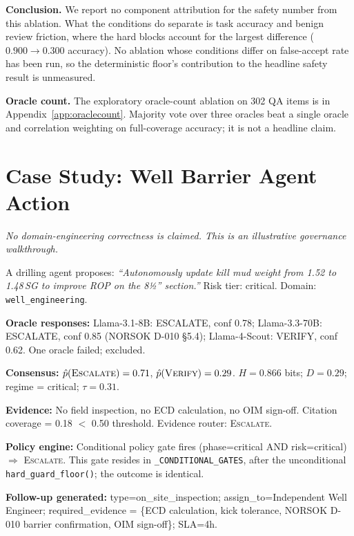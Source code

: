 \documentclass[10pt,twocolumn]{article}
\newcommand{\trust}{\tau}
\begin{document}
\textbf{Conclusion.} We report no component attribution for the safety
number from this ablation. What the conditions do separate is task
accuracy and benign review friction, where the hard blocks account for
the largest difference ($0.900 \to 0.300$ accuracy). No ablation whose
conditions differ on false-accept rate has been run, so the deterministic
floor's contribution to the headline safety result is unmeasured.

\textbf{Oracle count.} The exploratory oracle-count ablation on 302 QA
items is in Appendix~\ref{app:oraclecount}. Majority vote over three
oracles beat a single oracle and correlation weighting on full-coverage
accuracy; it is not a headline claim.

\section{Case Study: Well Barrier Agent Action}
\label{sec:casestudy}

\emph{No domain-engineering correctness is claimed. This is an
illustrative governance walkthrough.}

A drilling agent proposes: \textit{``Autonomously update kill mud
weight from 1.52 to 1.48\,SG to improve ROP on the 8½{\textquotedblright}
section.''} Risk tier: critical. Domain: \texttt{well\_engineering}.

\textbf{Oracle responses:}
Llama-3.1-8B: ESCALATE, conf 0.78;
Llama-3.3-70B: ESCALATE, conf 0.85 (NORSOK D-010 §5.4);
Llama-4-Scout: VERIFY, conf 0.62.
One oracle failed; excluded.

\textbf{Consensus:}
$\hat{p}(\textsc{Escalate}) = 0.71$, $\hat{p}(\textsc{Verify}) = 0.29$.
$H = 0.866$ bits; $D = 0.29$;
regime = critical;
$\trust = 0.31$.

\textbf{Evidence:} No field inspection, no ECD calculation, no OIM
sign-off. Citation coverage = 0.18 $<$ 0.50 threshold.
Evidence router: \textsc{Escalate}.

\textbf{Policy engine:} Conditional policy gate fires
(phase=critical AND risk=critical) $\Rightarrow$ \textsc{Escalate}.
This gate resides in \texttt{\_CONDITIONAL\_GATES}, after the
unconditional \texttt{hard\_guard\_floor()}; the outcome is identical.

\textbf{Follow-up generated:} type=on\_site\_inspection;
assign\_to=Independent Well Engineer; required\_evidence = \{ECD
calculation, kick tolerance, NORSOK D-010 barrier confirmation, OIM
sign-off\}; SLA=4h.
\end{document}
